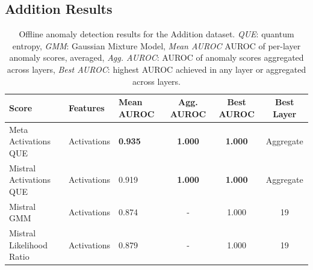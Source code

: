 \subsection{Addition Results}

\begin{table}[H]
\centering
\scriptsize  %
\renewcommand{\arraystretch}{1.2}  %
\setlength{\tabcolsep}{2pt}  %
\begin{tabular}{lp{3cm}lccc}
\toprule
\textbf{Score} & \textbf{Features} & \textbf{Mean AUROC} & \textbf{Agg. AUROC} & \textbf{Best AUROC} & \textbf{Best Layer} \\
\midrule
Meta Activations QUE             & Activations & \textbf{0.935}  & \textbf{1.000}  & \textbf{1.000}  & Aggregate \\ 
Mistral Activations QUE          & Activations & 0.919  & \textbf{1.000}  & \textbf{1.000}  & Aggregate \\ 
Mistral GMM & Activations & 0.874  & -      & 1.000  & 19 \\ 
Mistral Likelihood Ratio         & Activations & 0.879  & -      & 1.000  & 19 \\ 
\bottomrule
\end{tabular}
\caption{Offline anomaly detection results for the Addition dataset. \emph{QUE}: quantum entropy, \emph{GMM}: Gaussian Mixture Model, \emph{Mean AUROC} AUROC of per-layer anomaly scores, averaged, \emph{Agg. AUROC}: AUROC of anomaly scores aggregated across layers, \emph{Best AUROC}: highest AUROC achieved in any layer or aggregated across layers.}
\label{tab:offline_anomaly_addition}
\end{table}

